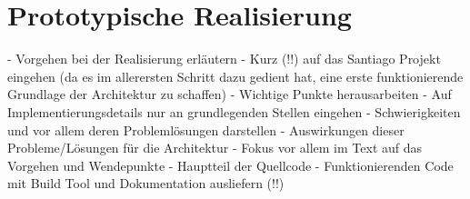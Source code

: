 
\chapter{Prototypische Realisierung} %
\label{cha:prototypische_realisierung}

- Vorgehen bei der Realisierung erläutern
- Kurz (!!) auf das Santiago Projekt eingehen (da es im allerersten Schritt dazu gedient hat, eine erste funktionierende Grundlage der Architektur zu schaffen)
- Wichtige Punkte herausarbeiten
- Auf Implementierungsdetails nur an grundlegenden Stellen eingehen
- Schwierigkeiten und vor allem deren Problemlösungen darstellen
- Auswirkungen dieser Probleme/Lösungen für die Architektur
- Fokus vor allem im Text auf das Vorgehen und Wendepunkte
- Hauptteil der Quellcode
- Funktionierenden Code mit Build Tool und Dokumentation ausliefern (!!)

